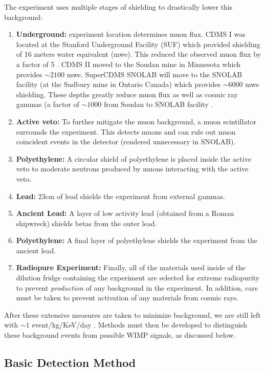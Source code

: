 \documentclass{report}
\begin{document}
The experiment uses multiple stages of shielding to drastically lower this background:
\begin{enumerate}
\item \textbf{Underground:} experiment location determines muon flux. CDMS I was located at the Stanford Underground Facility (SUF) which provided shielding of 16 meters water equivalent (mwe). This reduced the observed muon flux by a factor of 5 \cite{Abusaidi2000}. CDMS II moved to the Soudan mine in Minnesota which provides $\sim 2100$ mwe. SuperCDMS SNOLAB will move to the SNOLAB facility (at the Sudbury mine in Ontario Canada) which provides $\sim 6000$ mwe shielding. These depths greatly reduce muon flux as well as cosmic ray gammas (a factor of $\sim 1000$ from Soudan to SNOLAB facility \cite{Saab2012}.
\item \textbf{Active veto:} To further mitigate the muon background, a muon scintillator surrounds the experiment. This detects muons and can rule out muon coincident events in the detector (rendered unnecessary in SNOLAB).
\item \textbf{Polyethylene:} A circular shield of polyethylene is placed inside the active veto to moderate neutrons produced by muons interacting with the active veto.
\item \textbf{Lead:} 23cm of lead shields the experiment from external gammas.
\item \textbf{Ancient Lead:} A layer of low activity lead (obtained from a Roman shipwreck) shields betas from the outer lead.
\item \textbf{Polyethylene:} A final layer of polyethylene shields the experiment from the ancient lead.
\item \textbf{Radiopure Experiment:} Finally, all of the materials used inside of the dilution fridge containing the experiment are selected for extreme radiopurity to prevent \emph{production} of any background in the experiment. In addition, care must be taken to prevent activation of any materials from cosmic rays.
\end{enumerate}

After these extensive measures are taken to minimize background, we are still left with $\sim 1$ event/kg/KeV/day \cite{Saab2012}. Methods must then be developed to distinguish these background events from possible WIMP signals, as discussed below.

\subsection{Basic Detection Method}
\end{document}
